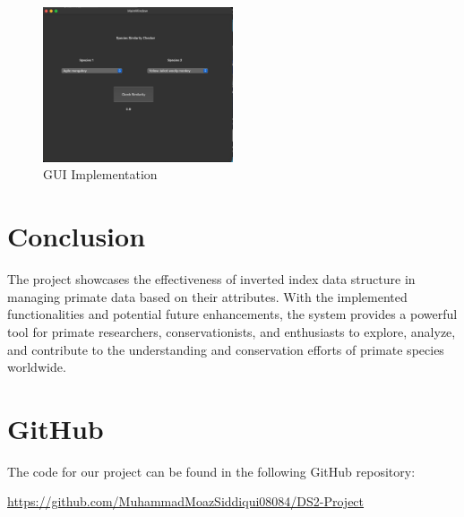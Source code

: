 \documentclass[a4paper,20pt,titlepage]{article}
\begin{document}
\begin{figure}[htbp]
    \centering
    \includegraphics[width=0.5\textwidth]{1.jpg}
    \caption{GUI Implementation}
    \label{fig:example}
\end{figure}

\section{Conclusion}
The project showcases the effectiveness of inverted index data structure in managing primate data based on their attributes. With the implemented functionalities and potential future enhancements, the system provides a powerful tool for primate researchers, conservationists, and enthusiasts to explore, analyze, and contribute to the understanding and conservation efforts of primate species worldwide.


\section{GitHub}
The code for our project can be found in the following GitHub repository:

\noindent
\url{https://github.com/MuhammadMoazSiddiqui08084/DS2-Project}




\end{document}
